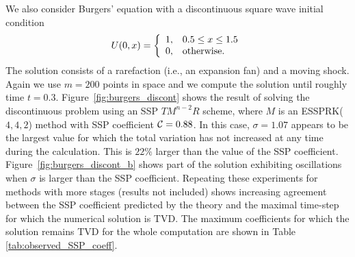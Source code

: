 We also consider Burgers' equation with a discontinuous
square wave initial condition
\begin{equation}\label{eq:burgers_discont_IC}
    U(0,x)  = \left\{
                \begin{array}{ll}
                  1, & \hbox{$0.5 \leq x \leq 1.5$} \\
                  0, & \hbox{otherwise.}
                \end{array}
              \right.
\end{equation}
The solution consists of a rarefaction (i.e., an expansion fan) and a
moving shock.
Again we use $m = 200$ points in space and we compute the solution until
roughly time $t = 0.3$.
Figure~\ref{fig:burgers_discont} shows the result of solving the
discontinuous problem using an SSP $TM^{n-2}R$ scheme, where $M$ is an
ESSPRK($4,4,2$) method with SSP coefficient $\mathcal{C} = 0.88$.
In this case, $\sigma = 1.07$ appears to be the largest value
for which the total variation has not increased at any time
during the calculation.
This is $22\%$ larger than the value of the SSP coefficient.
Figure~\ref{fig:burgers_discont_b} shows part of the solution exhibiting 
oscillations when $\sigma$ is %
larger than the SSP coefficient.
Repeating these experiments for methods with more stages (results not
included) shows increasing agreement between the SSP coefficient
predicted by the theory and the maximal time-step for which the
numerical solution is TVD.
The maximum coefficients for which the solution remains TVD for the 
whole computation are shown in Table \ref{tab:observed_SSP_coeff}. 

